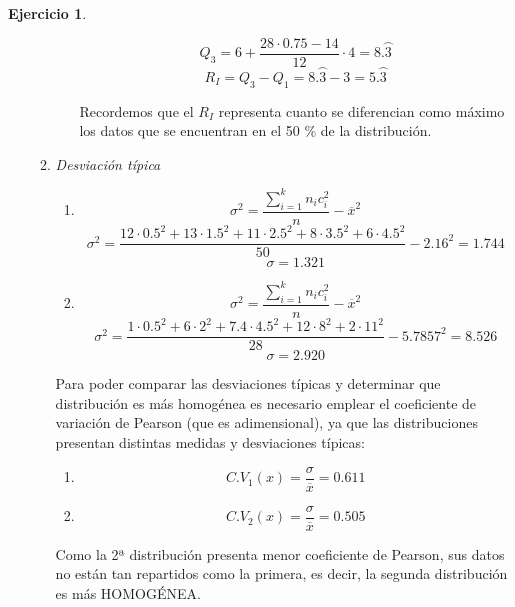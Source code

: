 \documentclass[a4paper, 12pt]{article}
\theoremstyle{definition}
\newtheorem{ej}{Ejercicio}
\begin{document}
\begin{ej}
\begin{enumerate}[label=\textit{\alph*)}]
\begin{enumerate}[label=\arabic*)]
\begin{enumerate}[label=(\arabic*)]
    \[
    Q_3 = 6 + \frac{28 \cdot 0.75 - 14}{12} \cdot 4 = 8.\wideparen{3}
    \]
    \[
    R_I = Q_3 - Q_1 = 8.\wideparen{3} - 3 = 5.\wideparen{3}
    \]
    
    Recordemos que el \(R_I\) representa cuanto se diferencian como máximo los datos que se encuentran en el 50 \% de la distribución.
    \end{enumerate}
    
    \item \textit{Desviación típica}
    
    \begin{enumerate}[label=(\arabic*)]
        \item 
        \[
            \sigma^2 = \frac{\sum_{i=1}^{k}n_ic_i^2}{n} - \overline{x}^2  
        \]
        \[
        \sigma^2 = \frac{12 \cdot 0.5^2 + 13 \cdot 1.5^2 + 11 \cdot 2.5^2 + 8 \cdot 3.5^2 + 6 \cdot 4.5^2}{50} - 2.16^2 = 1.744
        \]
        \[
        \sigma = 1.321
        \]
        
        \item
        \[
            \sigma^2 = \frac{\sum_{i=1}^{k}n_ic_i^2}{n} - \overline{x}^2  
        \]
        \[
        \sigma^2 = \frac{1 \cdot 0.5^2 + 6 \cdot 2^2 + 7.4 \cdot 4.5^2 + 12 \cdot 8^2 + 2 \cdot 11^2}{28} - 5.7857^2 = 8.526
        \]
        \[
        \sigma = 2.920
        \]
    \end{enumerate}
    
    Para poder comparar las desviaciones típicas y determinar que distribución es más homogénea es necesario emplear el coeficiente de variación de Pearson (que es adimensional), ya que las distribuciones presentan distintas medidas y desviaciones típicas:
    \begin{enumerate}[label=(\arabic*)]
        \item 
        \[
        C.V_1(x) = \frac{\sigma}{\overline{x}} = 0.611
        \]
        \item
        \[
        C.V_2(x) = \frac{\sigma}{\overline{x}} = 0.505
        \]
    \end{enumerate}
    
         Como la 2ª distribución presenta menor coeficiente de Pearson, sus datos no están tan repartidos como la primera, es decir, la segunda distribución es más HOMOGÉNEA.
     \end{enumerate}
    
\end{enumerate}
\end{ej}
\end{document}

